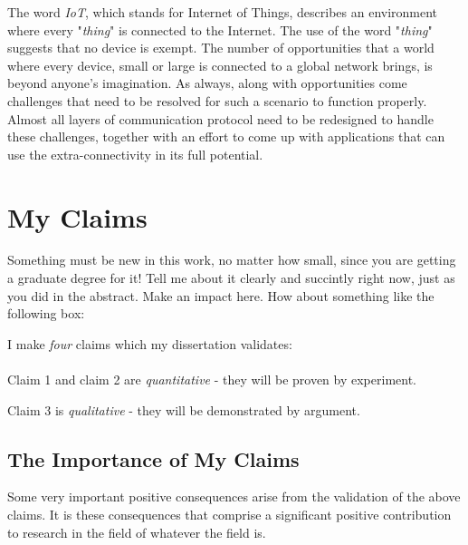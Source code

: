 \label{chapter:introduction}

The word \textit{IoT}, which stands for Internet of Things, describes an environment where every "\textit{thing}" is connected to the Internet. The use of the word "\textit{thing}" suggests that no device is exempt. The number of opportunities that a world where every device, small or large is connected to a global network brings, is beyond anyone's imagination. As always, along with opportunities come challenges that need to be resolved for such a scenario to function properly. Almost all layers of communication protocol need to be redesigned to handle these challenges, together with an effort to come up with applications that can use the extra-connectivity in its full potential.
\section{My Claims}
Something must be new in this work, no matter how small, since you are getting a graduate degree for it! Tell me about it clearly and succintly right now, just as you did in the abstract. Make an impact here. How about something like the following box:

I make \textit{four} claims which
my dissertation validates:
\\

\\

\noindent Claim 1 and claim 2 are \textit{quantitative} - they will be proven by experiment.

\noindent Claim 3 is \textit{qualitative} - they will be demonstrated by argument.

\subsection{The Importance of My Claims}

Some very important positive consequences
arise from the validation of the above claims.
It is these consequences that comprise a significant
positive contribution to research in the field
of whatever the field is.
\\

